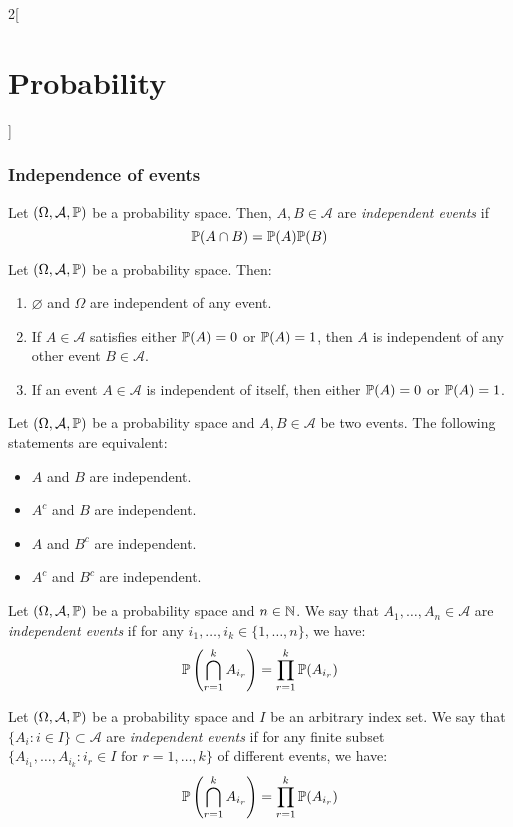 \documentclass[../../../main.tex]{subfiles}
\begin{document}
\begin{multicols}{2}[\section{Probability}]
  \subsubsection{Independence of events}
  \begin{definition}
    Let $(\Omega,\mathcal{A},\mathbb{P})$ be a probability space. Then, $A,B\in\mathcal{A}$ are \textit{independent events} if $$\mathbb{P}(A\cap B)=\mathbb{P}(A)\mathbb{P}(B)$$
  \end{definition}
  \begin{prop}
    Let $(\Omega,\mathcal{A},\mathbb{P})$ be a probability space. Then:
    \begin{enumerate}
      \item $\varnothing$ and $\Omega$ are independent of any event.
      \item If $A\in\mathcal{A}$ satisfies either $\mathbb{P}(A)=0$ or $\mathbb{P}(A)=1$, then $A$ is independent of any other event $B\in\mathcal{A}$.
      \item If an event $A\in\mathcal{A}$ is independent of itself, then either $\mathbb{P}(A)=0$ or $\mathbb{P}(A)=1$.
    \end{enumerate}
  \end{prop}
  \begin{prop}
    Let $(\Omega,\mathcal{A},\mathbb{P})$ be a probability space and $A,B\in\mathcal{A}$ be two events. The following statements are equivalent:
    \begin{itemize}
      \item $A$ and $B$ are independent.
      \item $A^c$ and $B$ are independent.
      \item $A$ and $B^c$ are independent.
      \item $A^c$ and $B^c$ are independent.
    \end{itemize}
  \end{prop}
  \begin{definition}
    Let $(\Omega,\mathcal{A},\mathbb{P})$ be a probability space and $n\in\mathbb{N}$. We say that $A_1,\ldots,A_n\in\mathcal{A}$ are \textit{independent events} if for any $i_1,\ldots,i_k\in\{1,\ldots,n\}$, we have: $$\mathbb{P}\left(\bigcap_{r=1}^kA_{i_r}\right)=\prod_{r=1}^k\mathbb{P}(A_{i_r})$$
  \end{definition}
  \begin{definition}
    Let $(\Omega,\mathcal{A},\mathbb{P})$ be a probability space and $I$ be an arbitrary index set. We say that $\{A_i:i\in I\}\subset\mathcal{A}$ are \textit{independent events} if for any finite subset $\{A_{i_1},\ldots, A_{i_k}:i_r\in I\text{ for }r=1,\ldots,k\}$ of different events, we have: $$\mathbb{P}\left(\bigcap_{r=1}^kA_{i_r}\right)=\prod_{r=1}^k\mathbb{P}(A_{i_r})$$
  \end{definition}

\end{multicols}
\end{document}
